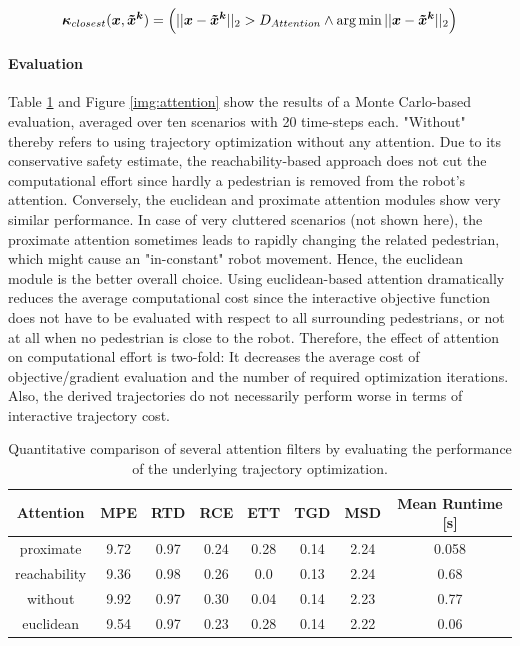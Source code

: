 \begin{equation}
\attention_{closest}(\x, \xped[k]) = \left( ||\x - \xped[k]||_2 > D_{Attention} \land \arg \min ||\x - \xped[k]||_2 \right)
\end{equation}

\paragraph{Evaluation}
Table \ref{table:attention} and Figure \ref{img:attention} show the results of a Monte Carlo-based evaluation, averaged over ten scenarios with 20 time-steps each. "Without" thereby refers to using trajectory optimization without any attention. Due to its conservative safety estimate, the reachability-based approach does not cut the computational effort since hardly a pedestrian is removed from the robot's attention. Conversely, the euclidean and proximate attention modules show very similar performance. In case of very cluttered scenarios (not shown here), the proximate attention sometimes leads to rapidly changing the related pedestrian, which might cause an "in-constant" robot movement. Hence, the euclidean module is the better overall choice.
\newline
Using euclidean-based attention dramatically reduces the average computational cost since the interactive objective function does not have to be evaluated with respect to all surrounding pedestrians, or not at all when no pedestrian is close to the robot. Therefore, the effect of attention on computational effort is two-fold: It decreases the average cost of objective/gradient evaluation and the number of required optimization iterations. Also, the derived trajectories do not necessarily perform worse in terms of interactive trajectory cost. 

\begin{table}[!ht]
\begin{center}
\begin{tabular}{c|c|c|c|c|c|c|c}
\bf Attention & \bf MPE & \bf RTD & \bf RCE & \bf ETT & \bf TGD & \bf MSD & \bf Mean Runtime [s] \\
\hline
proximate & 9.72 & 0.97 & 0.24 & 0.28 & 0.14 & 2.24 & 0.058 \\
\hline
reachability & 9.36 & 0.98 & 0.26 & 0.0 & 0.13 & 2.24 & 0.68 \\
\hline
\rowcolor{baseline_color}
without & 9.92 & 0.97 & 0.30 & 0.04 & 0.14 & 2.23 & 0.77 \\ 
\hline
\rowcolor{our_color}
euclidean & 9.54 & 0.97 & 0.23 & 0.28 & 0.14 & 2.22 & 0.06
\end{tabular}
\end{center}
\caption{Quantitative comparison of several attention filters by evaluating the performance of the underlying trajectory optimization.}
\label{table:attention}
\end{table}

